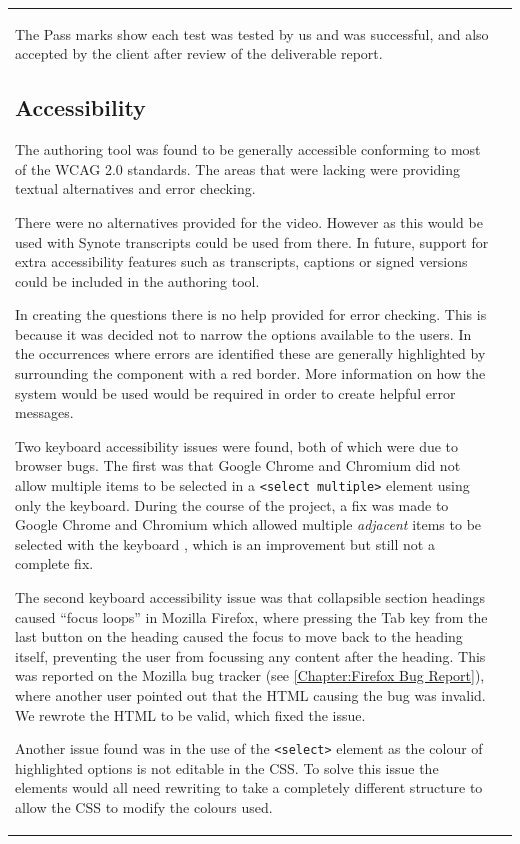 \begin{longtable}{|L{0.9}|L{0.03}|}
The Pass marks show each test was tested by us and was successful, and also accepted by the client after review of the deliverable report.

\subsection{Accessibility}
\label{Section:Testing_Authoring_tool_accessibility}

The authoring tool was found to be generally accessible conforming to most of the \gls{WCAG} 2.0 standards. The areas that were lacking were providing textual alternatives and error checking.

There were no alternatives provided for the video. However as this would be used with Synote transcripts could be used from there. In future, support for extra accessibility features such as transcripts, captions or signed versions could be included in the authoring tool.

In creating the questions there is no help provided for error checking. This is because it was decided not to narrow the options available to the users. In the occurrences where errors are identified these are generally highlighted by surrounding the component with a red border. More information on how the system would be used would be required in order to create helpful error messages.

Two keyboard accessibility issues were found, both of which were due to browser bugs. The first was that Google Chrome and Chromium did not allow multiple items to be selected in a \texttt{\textless select multiple\textgreater} element using only the keyboard. During the course of the project, a fix was made to Google Chrome and Chromium which allowed multiple \textit{adjacent} items to be selected with the keyboard \citep{ChromiumMultipleSelectBug}, which is an improvement but still not a complete fix.

The second keyboard accessibility issue was that collapsible section headings caused ``focus loops'' in Mozilla Firefox, where pressing the Tab key from the last button on the heading caused the focus to move back to the heading itself, preventing the user from focussing any content after the heading. This was reported on the Mozilla bug tracker \citep{FirefoxFocusLoopBug} (see \autoref{Chapter:Firefox Bug Report}), where another user pointed out that the HTML causing the bug was invalid. We rewrote the HTML to be valid, which fixed the issue.

Another issue found was in the use of the \texttt{\textless select\textgreater} element as the colour of highlighted options is not editable in the \gls{CSS}. To solve this issue the elements would all need rewriting to take a completely different structure to allow the \gls{CSS} to modify the colours used.


\end{longtable}
